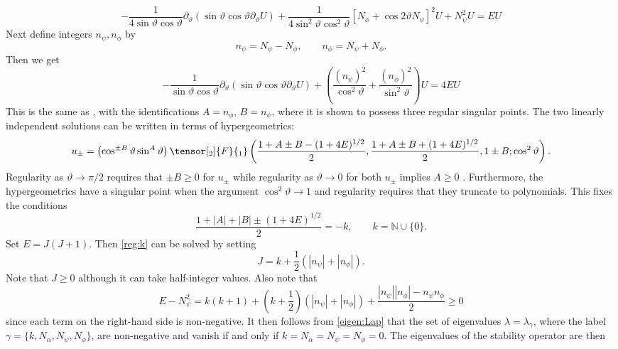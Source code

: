 \documentclass[11pt]{amsart}
\theoremstyle{plain}
\theoremstyle{definition}
\numberwithin{equation}{section}
\begin{document}
\begin{equation}
-\frac{1}{4 \sin\vartheta \cos\vartheta} \partial_\vartheta( \sin\vartheta \cos\vartheta \partial_\vartheta U) + \frac{1}{4 \sin^2\vartheta\cos^2\vartheta} \left[ N_\phi + \cos2\vartheta N_\psi\right]^2 U + N_\psi^2 U = E U
\end{equation} Next define integers $n_\psi, n_\phi$ by
\begin{equation}
    n_\psi = N_\psi - N_\phi, \qquad n_\phi = N_\psi + N_\phi.
\end{equation} Then we get
\begin{equation}
-\frac{1}{ \sin\vartheta \cos\vartheta} \partial_\vartheta( \sin\vartheta \cos\vartheta \partial_\vartheta U) + \left(\frac{(n_\psi)^2}{\cos^2\vartheta} + \frac{(n_\phi)^2}{\sin^2\vartheta} \right) U= 4E U
\end{equation} This is the same as \cite[Eq.(36)]{Gibbons:2004em}, with the identifications $A = n_\phi$, $B = n_\psi$, where it is shown to possess three regular singular points. The two linearly independent solutions can be written in terms of hypergeometrics:
\begin{equation} \nonumber
    u_\pm = \left( \cos^{\pm B} \vartheta \sin^A\vartheta\right) \tensor[_2]{F}{_1} \left( \frac{1 + A \pm B - (1 + 4E)^{1/2}}{2}, \frac{1 + A \pm B + (1 + 4E)^{1/2}}{2}, 1 \pm B; \cos^2\vartheta \right).
\end{equation} Regularity as $\vartheta \to \pi/2$ requires that $\pm B \geq 0$ for $u_\pm$ while regularity as $\vartheta \to 0$ for both $u_\pm$ implies $A \geq 0$ \cite{Gibbons:2004em}. Furthermore, the hypergeometrics have a singular point when the argument $\cos^2\vartheta \to 1$ and regularity requires that they truncate to polynomials. This fixes the conditions
\begin{equation}\label{reg:k}
\frac{1 + |A| + |B| \pm (1 + 4E)^{1/2}}{2} = -k, \qquad k = \mathbb{N} \cup \{0 \}.
\end{equation} Set $E = J(J+1)$. Then \eqref{reg:k} can be solved by setting
\begin{equation}
    J = k + \frac{1}{2}( |n_\psi| + |n_\phi|).
\end{equation} Note that $J \geq 0$ although it can take half-integer values. 
Also note that 
\begin{equation}
    E - N_\psi^2 = k(k+1) + \left( k + \frac{1}{2}\right)(|n_\psi| + |n_\phi|) + \frac{|n_\psi| |n_\phi| - n_\psi n_\phi}{2} \geq 0
\end{equation} since each term on the right-hand side is non-negative. It then follows from \eqref{eigen:Lap} that the set of eigenvalues $\lambda = \lambda_\gamma$, where the label $\gamma =\{k,N_\alpha,N_\psi,N_\phi\}$, are non-negative  and vanish if and only if $k = N_\alpha = N_\psi = N_\phi=0$. The eigenvalues of the stability operator are then
\end{document}

